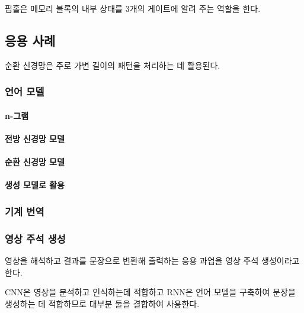\documentclass [12pt] {oblivoir}
\let\oldsubsubsection=\subsubsection
\renewcommand{\subsubsection}
{
  \filbreak
  \oldsubsubsection
}
\begin{document}
핍홀은 메모리 블록의 내부 상태를 3개의 게이트에 알려 주는 역할을 한다.

\subsection{응용 사례}

순환 신경망은 주로 가변 길이의 패턴을 처리하는 데 활용된다.

\subsubsection{언어 모델}

\paragraph*{n-그램}\mbox{}

\vspace{3mm}

\paragraph*{전방 신경망 모델}\mbox{}

\vspace{3mm}

\paragraph*{순환 신경망 모델}\mbox{}

\vspace{3mm}

\paragraph*{생성 모델로 활용}\mbox{}

\vspace{3mm}

\subsubsection{기계 번역}

\subsubsection{영상 주석 생성}

영상을 해석하고 결과를 문장으로 변환해 출력하는 응용 과업을 영상 주석 생성이라고 한다.

CNN은 영상을 분석하고 인식하는데 적합하고 RNN은 언어 모델을 구축하여 문장을 생성하는 데 적합하므로 대부분 둘을 결합하여 사용한다.
\end{document}
